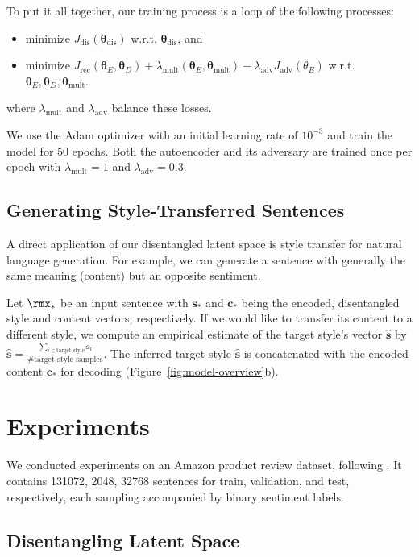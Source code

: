 To put it all together, our training process is a loop of the following processes:
\begin{itemize}
	\item minimize $J_\text{dis}(\bm\theta_\text{dis})$ w.r.t. $\bm\theta_\text{dis}$, and
	\item minimize $J_\text{rec}(\bm\theta_E, \bm\theta_D) + \lambda_\text{mult}(\bm\theta_E,\bm\theta_\text{mult}) -\lambda_\text{adv}
		      J_\text{adv}(\theta_E)$ w.r.t. $\bm\theta_E, \bm\theta_D, \bm\theta_\text{mult}$.
\end{itemize}
where $\lambda_\text{mult}$ and $\lambda_\text{adv}$ balance these losses.

We use the Adam optimizer \cite{kingma2014adam} with an initial learning rate of $10^{-3}$ and train the model for 50 epochs. Both the autoencoder and its adversary are trained once per epoch with $\lambda_\text{mult} = 1$ and $\lambda_\text{adv} = 0.3$.

\subsection{Generating Style-Transferred Sentences} \label{ss:prediction}

A direct application of our disentangled latent space is style transfer for natural language generation. For example, we can generate a sentence with generally the same meaning (content) but an opposite sentiment.

Let $\rmx_*$ be an input sentence with $\bm s_*$ and $\bm c_*$ being the encoded, disentangled style and content vectors, respectively. If we would like to transfer its content to a different style, we compute an empirical estimate of the target style's vector $\hat{\bm s}$ by
$\hat{\bm s}=\frac{\sum_{i\in\text{target style}}\bm s_i}{\text{\# target style samples}}$. The inferred target style $\hat{\bm s}$ is concatenated with the encoded content $\bm c_*$ for decoding (Figure~\ref{fig:model-overview}b).

\section{Experiments}
We conducted experiments on an Amazon product review dataset, following \cite{fu2017style}. It contains 131072, 2048, 32768 sentences for train, validation, and test, respectively, each sampling accompanied by binary sentiment labels.

\subsection{Disentangling Latent Space}



